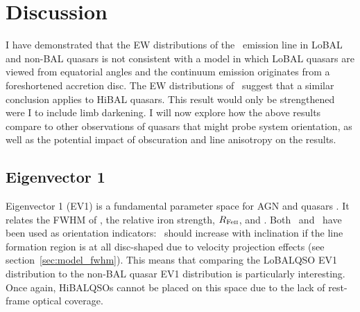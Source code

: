 

\section{Discussion}
\label{sec:discuss_ew}
I have demonstrated that the EW distributions of the 
\oiiifull\ emission line in LoBAL and non-BAL
quasars is not consistent with a 
model in which LoBAL quasars are viewed from equatorial angles 
and the continuum emission originates from
a foreshortened accretion disc. The EW distributions of 
\civline\ suggest that a similar conclusion applies to HiBAL quasars.
This result would only be strengthened were 
I to include limb darkening. I will now explore how the above results compare to other
observations of quasars that might probe system orientation, as 
well as the potential impact of obscuration and line anisotropy
on the results.

\subsection{Eigenvector 1}

Eigenvector 1 (EV1) is a fundamental parameter space for AGN and quasars
\citep{borosongreen,sulentic2000ev1,marziani2001,shenho2014}. 
It relates the FWHM of \hb, the relative iron strength, 
$R_{{\rm Fe \textsc{ii}}}$, and
\ewo. Both \ewo\ and \fwh\ have been used as orientation
indicators: \fwh\ should increase with inclination if the line formation
region is at all disc-shaped due to velocity projection effects (see section~\ref{sec:model_fwhm}).
This means that comparing the LoBALQSO EV1 distribution to the non-BAL 
quasar EV1 distribution is particularly interesting. Once again,
HiBALQSOs cannot be placed on this space due to the lack of rest-frame 
optical coverage.


